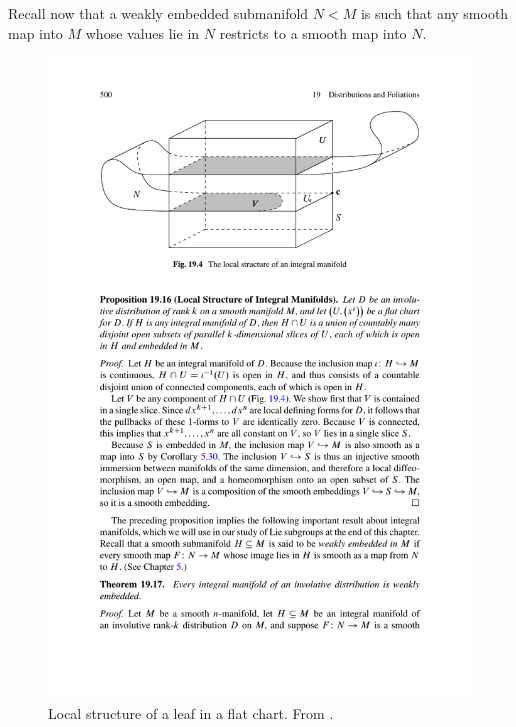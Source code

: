 Recall now that a weakly embedded submanifold $N<M$ is such that any smooth map into $M$ whose values lie in $N$ restricts to a smooth map into $N$.

\begin{figure}
    \centering
    \includegraphics[scale=0.8]{figures/frobenius_2.pdf}
    \caption{Local structure of a leaf in a flat chart. From \cite{Lee}.}
    \label{fig: frobenius2}
\end{figure}


